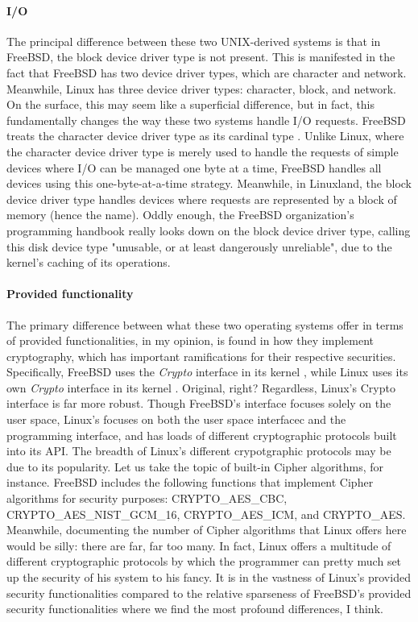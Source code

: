 \documentclass[letterpaper,10pt,titlepage]{article}
\begin{document}
\paragraph{I/O}
The principal difference between these two UNIX-derived systems is that in FreeBSD, the block device driver type is not present. This is manifested in the fact that FreeBSD has two device driver types, which are character and network. Meanwhile, Linux has three device driver types: character, block, and network. On the surface, this may seem like a superficial difference, but in fact, this fundamentally changes the way these two systems handle I/O requests. FreeBSD treats the character device driver type as its cardinal type \cite{freeBSD2}. Unlike Linux, where the character device driver type is merely used to handle the requests of simple devices where I/O can be managed one byte at a time, FreeBSD handles all devices using this one-byte-at-a-time strategy. Meanwhile, in Linuxland, the block device driver type handles devices where requests are represented by a block of memory (hence the name). Oddly enough, the FreeBSD organization's programming handbook really looks down on the block device driver type, calling this disk device type "unusable, or at least dangerously unreliable", due to the kernel's caching of its operations.  

\paragraph{Provided functionality}
The primary difference between what these two operating systems offer in terms of provided functionalities, in my opinion, is found in how they implement cryptography, which has important ramifications for their respective securities. Specifically, FreeBSD uses the \emph{Crypto} interface in its kernel \cite{freeBSD2}, while Linux uses its own \emph{Crypto} interface in its kernel \cite{linux2}. Original, right? Regardless, Linux's Crypto interface is far more robust. Though FreeBSD's interface focuses solely on the user space, Linux's focuses on both the user space interfacec and the programming interface, and has loads of different cryptographic protocols built into its API. The breadth of Linux's different crypotgraphic protocols may be due to its popularity. Let us take the topic of built-in Cipher algorithms, for instance. FreeBSD includes the following functions that implement Cipher algorithms for security purposes: CRYPTO\_AES\_CBC, CRYPTO\_AES\_NIST\_GCM\_16, CRYPTO\_AES\_ICM, and CRYPTO\_AES. Meanwhile, documenting the number of Cipher algorithms that Linux offers here would be silly: there are far, far too many. In fact, Linux offers a multitude of different cryptographic protocols by which the programmer can pretty much set up the security of his system to his fancy. It is in the vastness of Linux's provided security functionalities compared to the relative sparseness of FreeBSD's provided security functionalities where we find the most profound differences, I think. 
\end{document}
